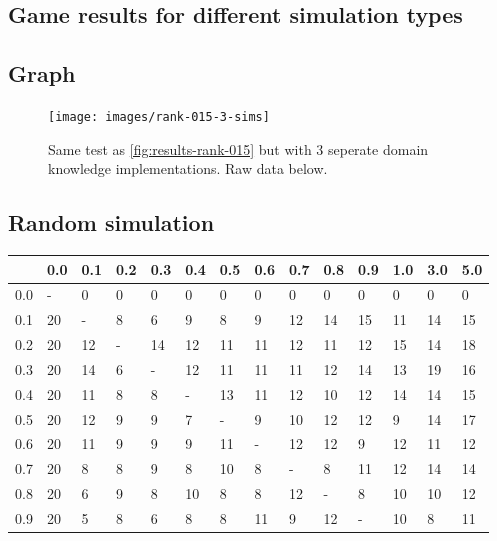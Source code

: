 \documentclass[
11pt, %
english, %
singlespacing, %
headsepline, %
]{MastersDoctoralThesis} %
\begin{document}
\begin{appendices}
\section{Game results for different simulation types}

\subsection{Graph}
\begin{figure}[H]
	\centering
	\texttt{[image: images/rank-015-3-sims]}
	\caption{Same test as \ref{fig:results-rank-015} but with 3 seperate domain knowledge implementations. Raw data below.}
\end{figure}

\subsection{Random simulation}
\begin{table}[H]
	\centering
	\begin{tabular}{|l||l|l|l|l|l|l|l|l|l|l|l|l|l|}
		\hline
		& 0.0 & 0.1 & 0.2 & 0.3 & 0.4 & 0.5 & 0.6 & 0.7 & 0.8 & 0.9 & 1.0 & 3.0 & 5.0 \\ \hline
	    \hline
		0.0 & -   & 0   & 0   & 0   & 0   & 0   & 0   & 0   & 0   & 0   & 0   & 0   & 0   \\ \hline
		0.1 & 20  & -   & 8   & 6   & 9   & 8   & 9   & 12  & 14  & 15  & 11  & 14  & 15  \\ \hline
		0.2 & 20  & 12  & -   & 14  & 12  & 11  & 11  & 12  & 11  & 12  & 15  & 14  & 18  \\ \hline
		0.3 & 20  & 14  & 6   & -   & 12  & 11  & 11  & 11  & 12  & 14  & 13  & 19  & 16  \\ \hline
		0.4 & 20  & 11  & 8   & 8   & -   & 13  & 11  & 12  & 10  & 12  & 14  & 14  & 15  \\ \hline
		0.5 & 20  & 12  & 9   & 9   & 7   & -   & 9   & 10  & 12  & 12  & 9   & 14  & 17  \\ \hline
		0.6 & 20  & 11  & 9   & 9   & 9   & 11  & -   & 12  & 12  & 9   & 12  & 11  & 12  \\ \hline
		0.7 & 20  & 8   & 8   & 9   & 8   & 10  & 8   & -   & 8   & 11  & 12  & 14  & 14  \\ \hline
		0.8 & 20  & 6   & 9   & 8   & 10  & 8   & 8   & 12  & -   & 8   & 10  & 10  & 12  \\ \hline
		0.9 & 20  & 5   & 8   & 6   & 8   & 8   & 11  & 9   & 12  & -   & 10  & 8   & 11  \\ \hline

\end{tabular}
\end{table}
\end{appendices}
\end{document}

